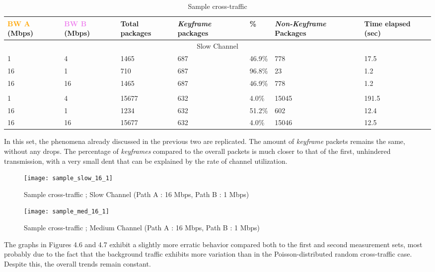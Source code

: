 \begin{table}[htbp]
\caption{Sample cross-traffic}
\break
\setlength{\arrayrulewidth}{1mm}
\setlength{\tabcolsep}{12pt}
\renewcommand{\arraystretch}{1.5}
 {
\begin{tabular}{ |p{1.375cm}|p{1.375cm}|p{1.5cm}|p{1.5cm}|p{1cm}|p{1.75cm}|p{1.75cm}| }
\hline
\textcolor{orange}{BW A} (Mbps)&\textcolor{violet}{BW B} (Mbps)& Total packages & \textit{Keyframe} packages & \% & \textit{Non-Keyframe} Packages & Time elapsed (sec) \\
\hline
\multicolumn{7}{|c|}{Slow Channel} \\
\hline
1&4&1465&687&46.9\%&778&17.5\\
16&1&710&687&96.8\%&23&1.2\\
16&16&1465&687&46.9\%&778&1.2\\
\hline
\rowcolor{white}\multicolumn{7}{|c|}{Medium Channel} \\
\hline
1&4&15677&632&4.0\%&15045&191.5\\
16&1&1234&632&51.2\%&602&12.4\\
16&16&15677&632&4.0\%&15046&12.5\\
\hline
\end{tabular}
}
\end{table}

In this set, the phenomena already discussed in the previous two are replicated. The amount of \textit{keyframe} packets remains the same, without any drops. The percentage of \textit{keyframes} compared to the overall packets is much closer to that of the first, unhindered transmission, with a very small dent that can be explained by the rate of channel utilization.

\begin{figure}[!ht]
\caption{Sample cross-traffic ; Slow Channel (Path A : 16 Mbps, Path B : 1 Mbps)}
\centering
\texttt{[image: sample\_slow\_16\_1]}
\end{figure}

\begin{figure}[!ht]
\caption{Sample cross-traffic ; Medium Channel (Path A : 16 Mbps, Path B : 1 Mbps)}
\centering
\texttt{[image: sample\_med\_16\_1]}
\end{figure}

The graphs in Figures 4.6 and 4.7 exhibit a slightly more erratic behavior compared both to the first and second measurement sets, most probably due to the fact that the background traffic exhibits more variation than in the Poisson-distributed random cross-traffic case. Despite this, the overall trends remain constant. 

